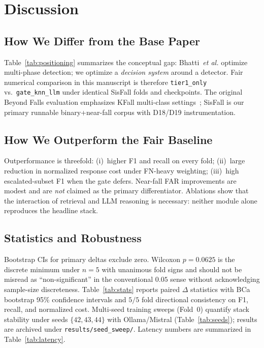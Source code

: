 \documentclass[journal]{IEEEtran}
\begin{document}
\section{Discussion}
\label{sec:discussion}

\subsection{How We Differ from the Base Paper}
Table~\ref{tab:positioning} summarizes the conceptual gap: Bhatti~\textit{et al.} optimize multi-phase detection; we optimize a \emph{decision system} around a detector. Fair numerical comparison in this manuscript is therefore \texttt{tier1\_only} vs.\ \texttt{gate\_knn\_llm} under identical SisFall folds and checkpoints. The original Beyond Falls evaluation emphasizes KFall multi-class settings~\cite{bhatti2025beyond,kfall2021}; SisFall is our primary runnable binary+near-fall corpus with D18/D19 instrumentation.

\subsection{How We Outperform the Fair Baseline}
Outperformance is threefold: (i)~higher F1 and recall on every fold; (ii)~large reduction in normalized response cost under FN-heavy weighting; (iii)~high escalated-subset F1 when the gate defers. Near-fall FAR improvements are modest and are \emph{not} claimed as the primary differentiator. Ablations show that the interaction of retrieval and LLM reasoning is necessary: neither module alone reproduces the headline stack.

\subsection{Statistics and Robustness}
Bootstrap CIs for primary deltas exclude zero. Wilcoxon $p{=}0.0625$ is the discrete minimum under $n{=}5$ with unanimous fold signs and should not be misread as ``non-significant'' in the conventional $0.05$ sense without acknowledging sample-size discreteness. Table~\ref{tab:stats} reports paired $\Delta$ statistics with BCa bootstrap 95\% confidence intervals and $5/5$ fold directional consistency on F1, recall, and normalized cost. Multi-seed training sweeps (Fold~0) quantify stack stability under seeds $\{42,43,44\}$ with Ollama/Mistral (Table~\ref{tab:seeds}); results are archived under \texttt{results/seed\_sweep/}. Latency numbers are summarized in Table~\ref{tab:latency}.
\end{document}
